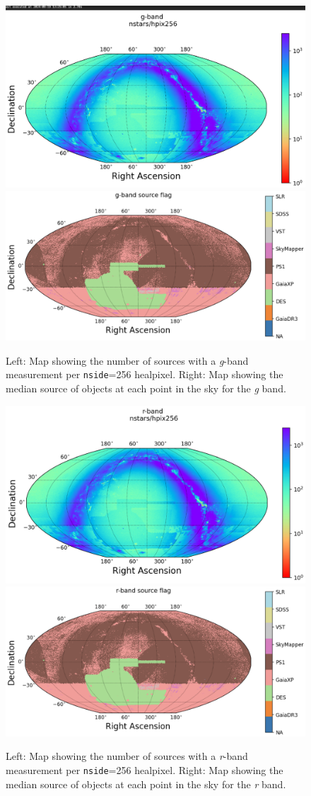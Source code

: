 \begin{figure}
    \includegraphics[width=0.48\linewidth]{./figures/source_density_maps/g-band-counts-full.png}
    \includegraphics[width=0.48\linewidth]{./figures/source_survey_maps/g-band_source.png}
    \caption{Left: Map showing the number of sources with a \textit{g}-band measurement per \texttt{nside}=256 healpixel.
    Right: Map showing the median source of objects at each point in the sky for the \textit{g} band.}
    \label{fig:monster-g}
\end{figure}
\begin{figure}
    \includegraphics[width=0.48\linewidth]{./figures/source_density_maps/r-band-counts-full.png}
    \includegraphics[width=0.48\linewidth]{./figures/source_survey_maps/r-band_source.png}
    \caption{Left: Map showing the number of sources with a \textit{r}-band measurement per \texttt{nside}=256 healpixel.
    Right: Map showing the median source of objects at each point in the sky for the \textit{r} band.}
    \label{fig:monster-r}
\end{figure}
